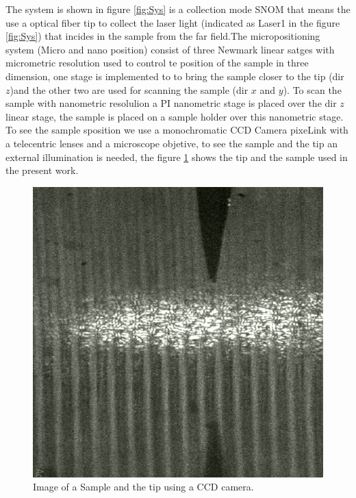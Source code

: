 \documentclass[reprint,aps,prb,citeautoscript,altaffilletter]{revtex4-2}
\begin{document}
	The system is shown in figure \ref{fig:Sys} is a collection mode SNOM that means  the use a optical fiber tip to collect the laser light (indicated as Laser1 in the figure \ref{fig:Sys}) that incides in the sample from the far field.The micropositioning system (Micro and nano position) consist of three Newmark linear satges  with micrometric resolution used to control te position of the sample in three dimension, one stage is implemented to to bring the sample closer to the tip (dir $z$)and the other two are used for  scanning the sample (dir $x$ and $y$).
	To scan the sample with nanometric resolulion a PI nanometric stage is placed over the dir $z$ linear stage, the sample is placed on a sample holder over this nanometric stage. To see the sample sposition we use a monochromatic CCD Camera pixeLink with a telecentric lenses and a microscope objetive, to see the sample and the tip an external illumination is needed, the figure \ref{fig:ts} shows the tip and the sample used in the present work. 
	\begin{figure}[!hbt]
		\centering
		\includegraphics[scale=0.5]{figures/tipSample.pdf}

		\caption{Image of a Sample and the tip using a CCD camera.}
		\label{fig:ts}
	\end{figure}
\end{document}
